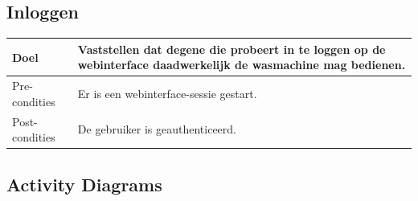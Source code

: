 \subsection{Inloggen}
\begin{center}
  \begin{tabular}{ | p{4cm} | p{8.5cm} | } \hline
  Doel & Vaststellen dat degene die probeert in te loggen op de webinterface daadwerkelijk de wasmachine mag bedienen. \\ \hline
  Pre-condities & Er is een webinterface-sessie gestart.\\ \hline
  Post-condities & De gebruiker is geauthenticeerd. \\ \hline
  \end{tabular}
\end{center}

\begin{landscape}
\thispagestyle{empty}
\clearpage
\section{Activity Diagrams}
\end{landscape}